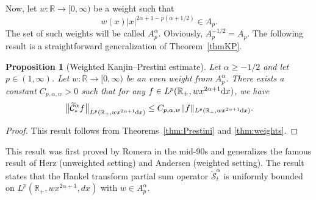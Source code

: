 \documentclass[11pt,oneside]{amsart}
\numberwithin{equation}{section}
\newtheorem{proposition}[equation]{Proposition}
\theoremstyle{definition}
\newcommand{\RR}{\mathbb{R}}
\newcommand{\calC}{\mathcal{C}}
\newcommand{\calS}{\mathcal{S}}
\begin{document}
Now, let $w\colon\RR\to[0,\infty)$ be a weight such that
\begin{equation}\label{eq:7:Apa}
    w(x)|x|^{2\alpha+1-p(\alpha+1/2)}\in A_p.
\end{equation}
The set of such weights will be called $A_p^\alpha$. Obviously, $A_p^{-1/2}=A_p$. The following result is a straightforward generalization of Theorem~\ref{thmKP}.
\begin{proposition}[Weighted Kanjin--Prestini estimate]\label{prop:romera}
Let $\alpha\geq-1/2$ and let $p\in(1,\infty)$. Let $w\colon\RR\to[0,\infty)$ be an even weight from $A_p^\alpha$. There exists a constant $C_{p,\alpha,w}>0$ such that for any $f\in L^p(\mathbb{R}_+,wx^{2\alpha+1}{\rm d}x)$, we have
\begin{equation}\label{wKPe}
    \big\|\widetilde{\calC}_{\ast}^\alpha f\big\|_{L^p(\RR_+,wx^{2\alpha+1}{\rm d}x)}\leq C_{p,\alpha,w}\|f\|_{L^p(\RR_+,wx^{2\alpha+1}{\rm d}x)}.
\end{equation}
\end{proposition}
\begin{proof}
This result follows from Theorems~\ref{thm:Prestini} and \ref{thm:weights}.
\end{proof}
This result was first proved by Romera \cite{Romera} in the mid-90s and generalizes the famous result of Herz \cite{Herz} (unweighted setting) and Andersen \cite{Andersen} (weighted setting). The result states that the Hankel transform partial sum operator $\widetilde{\calS}_{t}^\alpha$ is uniformly bounded on $L^p(\RR_+,wx^{2\alpha+1},dx)$ with $w\in A_p^\alpha$.
\end{document}
